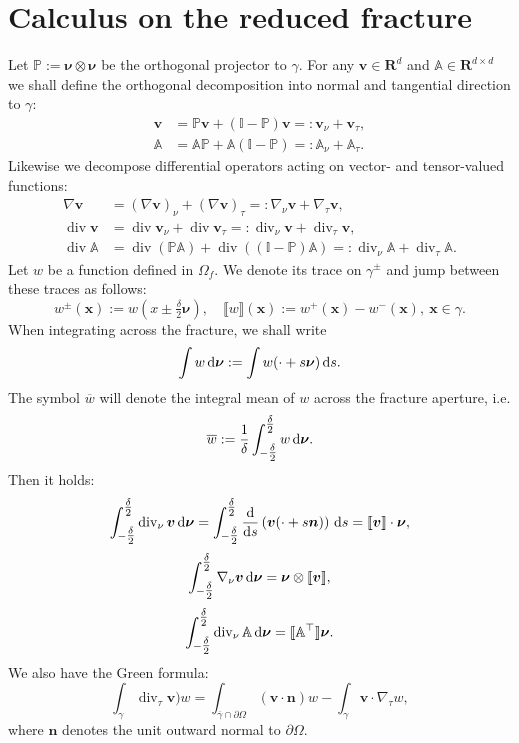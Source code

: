 \documentclass[a4paper]{article}
\def\d {\,{\rm d}}
\def\div{\operatorname{div}}
\def\dn{\d\nnu}
\def\jmp#1{\llbracket #1 \rrbracket}
\def\nn{\vc n}
\def\nnu{\vc\nu}
\def\prtl{\partial}
\def\Real{{\mathbf R}}
\def\tn#1{{\mathbb{#1}}}    %
\def\uu{\vc u}
\def\vc#1{\mathbf{\boldsymbol{#1}}}     %
\def\vv{\vc v}
\def\xx{\vc x}
\newcommand{\eq}[1]{\begin{equation}#1\end{equation}}
\begin{document}
\section{Calculus on the reduced fracture}

Let $\tn P := \nnu\otimes\nnu$ be the orthogonal projector to $\gamma$.
For any $\vv\in\Real^d$ and $\tn A\in\Real^{d\times d}$ we shall define the orthogonal decomposition into normal and tangential direction to $\gamma$:
\[ \begin{aligned}
\vv &= \tn P\vv + (\tn I-\tn P)\vv =:\vv_\nu + \vv_\tau,\\
\tn A &= \tn A\tn P + \tn A(\tn I-\tn P) =: \tn A_\nu + \tn A_\tau.
\end{aligned} \]
Likewise we decompose differential operators acting on vector- and tensor-valued functions:
\[ \begin{aligned}
\nabla\vv &= (\nabla\vv)_\nu + (\nabla\vv)_\tau =: \nabla_\nu\vv + \nabla_\tau\vv,\\
\div\vv &= \div\vv_\nu + \div\vv_\tau =: \div_\nu\vv + \div_\tau\vv,\\
\div\tn A &= \div(\tn P\tn A) + \div((\tn I-\tn P)\tn A) =: \div_\nu\tn A + \div_\tau\tn A.
\end{aligned} \]
Let $w$ be a function defined in $\Omega_f$.
We denote its trace on $\gamma^\pm$ and jump between these traces as follows:
\[ w^\pm(\xx) := w(x\pm\tfrac\delta2\nnu),\quad \jmp{w}(\xx) := w^+(\xx)-w^-(\xx),~\xx\in\gamma. \]
When integrating across the fracture, we shall write
\[ \int w\dn := \int w(\cdot+s\nnu)\d s. \]
The symbol $\overline w$ will denote the integral mean of $w$ across the fracture aperture, i.e.
\[ \overline w:=\frac1\delta\int_{-\tfrac\delta2}^{\tfrac\delta2} w \dn. \]
Then it holds:
\eq{ \label{eq:int_div_n}
\int_{-\tfrac\delta2}^{\tfrac\delta2}\div_\nu\vv\dn = \int_{-\tfrac\delta2}^{\tfrac\delta2}\frac{\rm d}{{\rm d}s}\left(\vv(\cdot+s\nn)\right)\d s = \jmp{\vv}\cdot\nnu,
}
\eq{ \int_{-\tfrac\delta2}^{\tfrac\delta2}\nabla_\nu\vv\dn = \nnu\otimes\jmp{\vv}, }
\eq{ \int_{-\tfrac\delta2}^{\tfrac\delta2}\div_\nu\tn A \dn = \jmp{\tn A^\top}\nnu. }
We also have the Green formula:
\eq{ \int_\gamma\div_\tau\vv)w = \int_{\overline\gamma\cap\partial\Omega}(\vv\cdot\nn)w - \int_\gamma\vv\cdot\nabla_\tau w, }
where $\nn$ denotes the unit outward normal to $\partial\Omega$.
\end{document}
